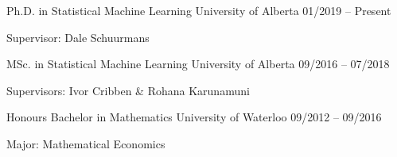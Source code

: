\begin{cventries}
  \cventry
    {Ph.D. in Statistical Machine Learning}
    {University of Alberta}
    {01/2019 -- Present}
    {
      \begin{cvitems}
        \item {Supervisor: Dale Schuurmans}
      \end{cvitems}
    }

  \cventry
    {MSc. in Statistical Machine Learning}
    {University of Alberta}
    {09/2016 -- 07/2018}
    {
      \begin{cvitems}
        \item {Supervisors: Ivor Cribben \& Rohana Karunamuni}
      \end{cvitems}
    }
  \cventry
    {Honours Bachelor in Mathematics}
    {University of Waterloo}
    {09/2012 -- 09/2016}
    {
      \begin{cvitems}
        \item Major: Mathematical Economics
      \end{cvitems}
    }
\end{cventries}

